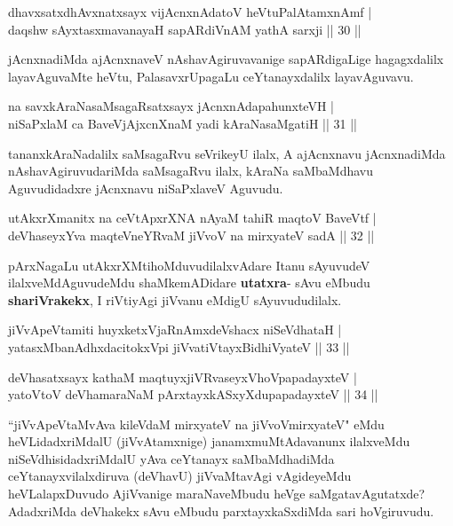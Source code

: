 \begin{shl}
dhavxsatxdhAvxnatxsayx vijAcnxnAdatoV heVtuPalAtamxnAmf |\\
daqshw sAyxtasxmavanayaH sapARdiVnAM yathA sarxji \hfill || 30 ||
\end{shl}

\begin{artha}
jAcnxnadiMda ajAcnxnaveV nAshavAgiruvavanige  sapARdigaLige hagagxdalilx layavAguvaMte heVtu, PalasavxrUpagaLu ceYtanayxdalilx 
layavAguvavu.
\end{artha}

\begin{shl}
na savxkAraNasaMsagaRsatxsayx jAcnxnAdapahunxteVH |\\
niSaPxlaM ca BaveVjAjxcnXnaM yadi kAraNasaMgatiH \hfill || 31 ||
\end{shl}

\begin{artha}
tananxkAraNadalilx saMsagaRvu seVrikeyU ilalx, A  ajAcnxnavu jAcnxnadiMda 
nAshavAgiruvudariMda saMsagaRvu ilalx, kAraNa saMbaMdhavu Aguvudidadxre jAcnxnavu 
niSaPxlaveV Aguvudu.
\end{artha}

\begin{shl}
utAkxrXmanitx na ceVtApxrXNA nAyaM tahiR maqtoV BaveVtf |\\
deVhaseyxYva maqteVneYRvaM jiVvoV na mirxyateV sadA \hfill || 32 ||
\end{shl}

\begin{artha}
pArxNagaLu utAkxrXMtihoMduvudilalxvAdare Itanu sAyuvudeV ilalxveMdAguvudeMdu shaMkemADidare \textbf{utatxra}- sAvu eMbudu \textbf{shariVrakekx}, I riVtiyAgi jiVvanu eMdigU sAyuvududilalx. 
\end{artha}


\begin{shl}
jiVvApeVtamiti huyxketxVjaRnAmxdeVshacx niSeVdhataH |\\
yatasxMbanAdhxdacitokxV\s pi jiVvatiVtayxBidhiVyateV \hfill || 33 ||
\end{shl}

\begin{shl}
deVhasatxsayx kathaM maqtuyxjiVRvaseyxVhoVpapadayxteV |\\
yatoV\s toV deVhamaraNaM pArxtayxkASxyXdupapadayxteV \hfill || 34 ||
\end{shl}

\begin{artha}
``jiVvApeVtaMvAva kileVdaM mirxyateV na jiVvoVmirxyateV" eMdu heVLidadxriMdalU (jiVvAtamxnige) janamxmuMtAdavanunx ilalxveMdu niSeVdhisidadxriMdalU yAva ceYtanayx saMbaMdhadiMda ceYtanayxvilalxdiruva (deVhavU) 
jiVvaMtavAgi vAgideyeMdu heVLalapxDuvudo AjiVvanige maraNaveMbudu heVge 
saMgatavAgutatxde? AdadxriMda deVhakekx sAvu eMbudu parxtayxkaSxdiMda sari hoVgiruvudu.
\end{artha}

